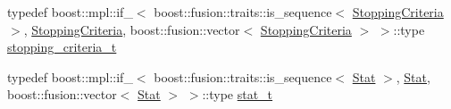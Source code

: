 \begin{DoxyCompactItemize}
\item 
typedef boost\+::mpl\+::if\+\_\+$<$ boost\+::fusion\+::traits\+::is\+\_\+sequence$<$ \hyperlink{classlimbo_1_1bayes__opt_1_1_bo_base_ac9ab3f37c746dcf70ef7096a89dd1b6c}{Stopping\+Criteria} $>$, \hyperlink{classlimbo_1_1bayes__opt_1_1_bo_base_ac9ab3f37c746dcf70ef7096a89dd1b6c}{Stopping\+Criteria}, boost\+::fusion\+::vector$<$ \hyperlink{classlimbo_1_1bayes__opt_1_1_bo_base_ac9ab3f37c746dcf70ef7096a89dd1b6c}{Stopping\+Criteria} $>$ $>$\+::type \hyperlink{classlimbo_1_1bayes__opt_1_1_bo_base_ad045a21de8950f3671f6b156f2271e44}{stopping\+\_\+criteria\+\_\+t}
\item 
typedef boost\+::mpl\+::if\+\_\+$<$ boost\+::fusion\+::traits\+::is\+\_\+sequence$<$ \hyperlink{classlimbo_1_1bayes__opt_1_1_bo_base_a0da8155a1a5be0999e112655ec3d610e}{Stat} $>$, \hyperlink{classlimbo_1_1bayes__opt_1_1_bo_base_a0da8155a1a5be0999e112655ec3d610e}{Stat}, boost\+::fusion\+::vector$<$ \hyperlink{classlimbo_1_1bayes__opt_1_1_bo_base_a0da8155a1a5be0999e112655ec3d610e}{Stat} $>$ $>$\+::type \hyperlink{classlimbo_1_1bayes__opt_1_1_bo_base_a67aac9bd22ae3de346afe7ffe5b564d3}{stat\+\_\+t}
\end{DoxyCompactItemize}

